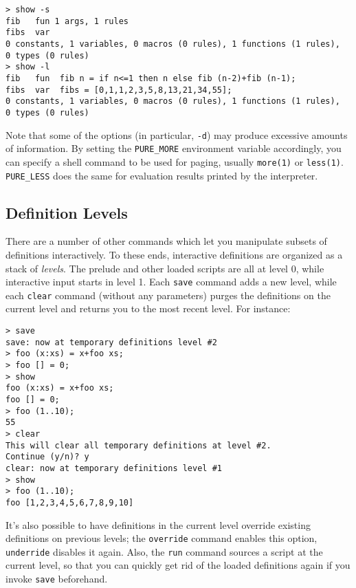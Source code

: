 \documentclass[a4paper,12pt]{article}
\begin{document}
\begin{lstlisting}
> show -s
fib   fun 1 args, 1 rules
fibs  var
0 constants, 1 variables, 0 macros (0 rules), 1 functions (1 rules),
0 types (0 rules)
> show -l
fib   fun  fib n = if n<=1 then n else fib (n-2)+fib (n-1);
fibs  var  fibs = [0,1,1,2,3,5,8,13,21,34,55];
0 constants, 1 variables, 0 macros (0 rules), 1 functions (1 rules),
0 types (0 rules)
\end{lstlisting}

Note that some of the options (in particular, \verb|-d|) may produce excessive amounts of information. By setting the \texttt{PURE\_MORE} environment variable accordingly, you can specify a shell command to be used for paging, usually \texttt{more(1)} or \texttt{less(1)}. \texttt{PURE\_LESS} does the same for evaluation results printed by the interpreter.

\subsection{Definition Levels}
\label{Levels}

There are a number of other commands which let you manipulate subsets of definitions interactively. To these ends, interactive definitions are organized as a stack of \emph{levels}. The prelude and other loaded scripts are all at level 0, while interactive input starts in level 1. Each \verb|save| command adds a new level, while each \verb|clear| command (without any parameters) purges the definitions on the current level and returns you to the most recent level. For instance:

\begin{lstlisting}
> save
save: now at temporary definitions level #2
> foo (x:xs) = x+foo xs;
> foo [] = 0;
> show
foo (x:xs) = x+foo xs;
foo [] = 0;
> foo (1..10);
55
> clear
This will clear all temporary definitions at level #2.
Continue (y/n)? y
clear: now at temporary definitions level #1
> show
> foo (1..10);
foo [1,2,3,4,5,6,7,8,9,10]
\end{lstlisting}

It's also possible to have definitions in the current level override existing definitions on previous levels; the \verb|override| command enables this option, \verb|underride| disables it again. Also, the \verb|run| command sources a script at the current level, so that you can quickly get rid of the loaded definitions again if you invoke \verb|save| beforehand.
\end{document}
